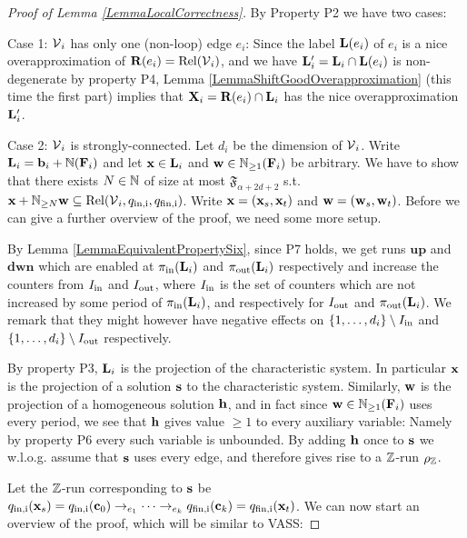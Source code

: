\begin{proof}[Proof of Lemma \ref{LemmaLocalCorrectness}]
By Property P2 we have two cases: 

Case 1: \(\operatorname{\mathcal{V}}_i\) has only one (non-loop) edge \(e_i\): Since the label \(\mathbf{L}(e_i)\) of \(e_i\) is a nice overapproximation of \(\mathbf{R}(e_i)=\operatorname{Rel}(\operatorname{\mathcal{V}}_i)\), and we have \(\mathbf{L}_i'=\mathbf{L}_i \cap \mathbf{L}(e_i)\) is non-degenerate by property P4, Lemma \ref{LemmaShiftGoodOverapproximation} (this time the first part) implies that \(\mathbf{X}_i=\mathbf{R}(e_i) \cap \mathbf{L}_i\) has the nice overapproximation \(\mathbf{L}_i'\).

Case 2: \(\operatorname{\mathcal{V}}_i\) is strongly-connected. Let \(d_i\) be the dimension of \(\operatorname{\mathcal{V}}_i\). Write \(\mathbf{L}_i=\mathbf{b}_i+\mathbb{N}(\mathbf{F}_i)\) and let \(\mathbf{x}\in \mathbf{L}_i\) and \(\mathbf{w}\in \mathbb{N}_{\geq 1}(\mathbf{F}_i)\) be arbitrary. We have to show that there exists \(N \in \mathbb{N}\) of size at most \(\mathfrak{F}_{\alpha+2d+2}\) s.t. \(\mathbf{x}+\mathbb{N}_{\geq N}\mathbf{w} \subseteq \operatorname{Rel}(\operatorname{\mathcal{V}}_i, q_{\text{in,i}}, q_{\text{fin,i}})\). Write \(\mathbf{x}=(\mathbf{x}_s, \mathbf{x}_t)\) and \(\mathbf{w}=(\mathbf{w}_s, \mathbf{w}_t)\). Before we can give a further overview of the proof, we need some more setup.

By Lemma \ref{LemmaEquivalentPropertySix}, since P7 holds, we get runs \(\mathbf{up}\) and \(\mathbf{dwn}\) which are enabled at \(\pi_{\text{in}}(\mathbf{L}_i)\) and \(\pi_{\text{out}}(\mathbf{L}_i)\) respectively and increase the counters from \(I_{\text{in}}\) and \(I_{\text{out}}\), where \(I_{\text{in}}\) is the set of counters which are not increased by some period of \(\pi_{\text{in}}(\mathbf{L}_i)\), and respectively for \(I_{\text{out}}\) and \(\pi_{\text{out}}(\mathbf{L}_i)\). We remark that they might however have negative effects on \(\{1,\dots, d_i\} \setminus I_{\text{in}}\) and \(\{1,\dots,d_i\} \setminus I_{\text{out}}\) respectively. 

By property P3, \(\mathbf{L}_i\) is the projection of the characteristic system. In particular \(\mathbf{x}\) is the projection of a solution \(\mathbf{s}\) to the characteristic system. Similarly, \(\mathbf{w}\) is the projection of a homogeneous solution \(\mathbf{h}\), and in fact since \(\mathbf{w} \in \mathbb{N}_{\geq 1}(\mathbf{F}_i)\) uses every period, we see that \(\mathbf{h}\) gives value \(\geq 1\) to every auxiliary variable: Namely by property P6 every such variable is unbounded. By adding \(\mathbf{h}\) once to \(\mathbf{s}\) we w.l.o.g. assume that \(\mathbf{s}\) uses every edge, and therefore gives rise to a \(\mathbb{Z}\)-run \(\rho_{\mathbb{Z}}\).

Let the \(\mathbb{Z}\)-run corresponding to \(\mathbf{s}\) be \(q_{\text{in,i}}(\mathbf{x}_s)=q_{\text{in,i}}(\mathbf{c}_0) \to_{e_1} \dots \to_{e_k}q_{\text{fin,i}}(\mathbf{c}_k)=q_{\text{fin,i}}(\mathbf{x}_t)\). We can now start an overview of the proof, which will be similar to VASS:


\end{proof}
